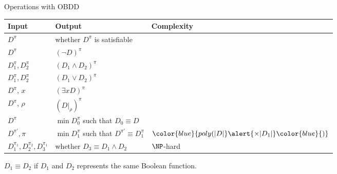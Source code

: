 \begin{frame}{Operations with OBDD}
      \begin{tabular}{|l|l|l|}
        \hline
        Input & Output & Complexity \\
        \hline
        $D^{\pi}$ & whether $D^{\pi}$ is satisfiable & \color{blue}{$O(|D|)$} \\
        \hline
        $D^{\pi}$ &  $(\lnot D)^{\pi}$ & \color{blue}{$O(|D|)$} \\
        \hline
        $D_1^{\pi}, D_2^{\pi}$ &  $(D_1\land D_2)^{\pi}$ & \color{blue}{$O(|D_1|\times |D_2|)$} \\
        \hline
        $D_1^{\pi}, D_2^{\pi}$ &  $(D_1\lor D_2)^{\pi}$ & \color{blue}{$O(|D_1|\times |D_2|)$} \\
        \hline
        $D^{\pi}$, $x$ &  $(\exists x D)^{\pi}$ & \color{blue}{$O(|D|)$} \\
        \hline
        $D^{\pi}$, $\rho$  &  $(D|_\rho)^{\pi}$ & \color{blue}{$O(|D|)$} \\
        \hline
        $D^{\pi}$ &  $\min D_0^{\pi}$ such that $D_0 \equiv D$ & \color{blue}{$O(|D|)$} \\
        \hline
        $D^{\pi'}, \pi$ &  $\min D_1^{\pi}$ such that $D^{\pi'} \equiv D_1^{\pi}$ &
                                    $\color{blue}{poly(|D|} \alert{\times |D_1|} \color{blue}{)}$ \\
        \hline
        $D_1^{\pi_1}, D_2^{\pi_2}, D_3^{\pi_1}$ & whether $D_3 \equiv D_1 \land D_2$ & \alert{$\NP$-hard} \\
        \hline
    \end{tabular}

    \bigskip
	$D_1 \equiv D_2$ if $D_1$ and $D_2$ represents the same Boolean function.
\end{frame}